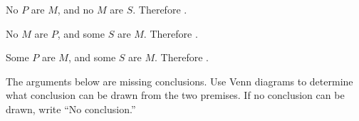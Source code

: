 \begin{exercises}
\item \label{itm:no_conclusion_set1_EEE} No $P$ are $M$, and no $M$ are $S$. Therefore \underline{\hspace{2cm}}.

\item No $M$ are $P$, and some $S$ are $M$. Therefore \underline{\hspace{2cm}}.
\item Some $P$ are $M$, and some $S$ are $M$. Therefore \underline{\hspace{2cm}}.
  \end{exercises}

\noindent \problempart The arguments below are missing conclusions. Use Venn diagrams to determine what conclusion can be drawn from the two premises. If no conclusion can be drawn, write ``No conclusion.''

